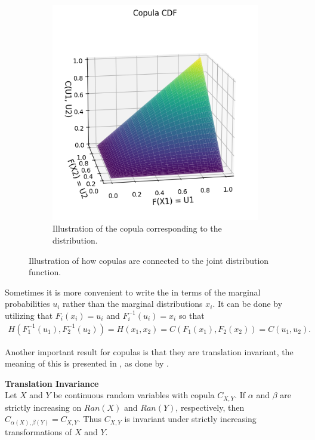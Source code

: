 \begin{figure}
\begin{subfigure}[t]{0.45\linewidth}
        \includegraphics[width=\linewidth]{3Theory/pictures/BivariateCopula.png}
        \caption{Illustration of the copula corresponding to the distribution.}
    \end{subfigure}
    \caption{Illustration of how copulas are connected to the joint distribution function.}
    \label{fig:CDFtoCopula}
\end{figure}


Sometimes it is more convenient to write the  in terms of the marginal probabilities $u_i$ rather than the marginal distributions $x_i$. It can be done by utilizing that $F_i(x_i) = u_i$ and $F_i^{-1}(u_i)= x_i$ so that 
\begin{align*}
    H(F_1^{-1}(u_1),F_2^{-1}(u_2))=H(x_1,x_2) = C(F_1(x_1), F_2(x_2))= C(u_1, u_2).
\end{align*}

Another important result for copulas is that they are translation invariant, the meaning of this is presented in , as done by \citet[p.~25]{Nelsen2006}.

\begin{theorem}\label{the:TranslationInvariance}
        \textbf{Translation Invariance}\\
        Let $X$ and $Y$ be continuous random variables with copula $C_{X, Y}$. If $\alpha$ and $\beta$ are strictly increasing on $Ran(X)$ and $Ran(Y)$, respectively, then $C_{\alpha(X),\beta(Y)}  = C_{X,Y}$. Thus $C_{X, Y}$ is invariant under strictly increasing transformations of $X$ and $Y$.
\end{theorem}

